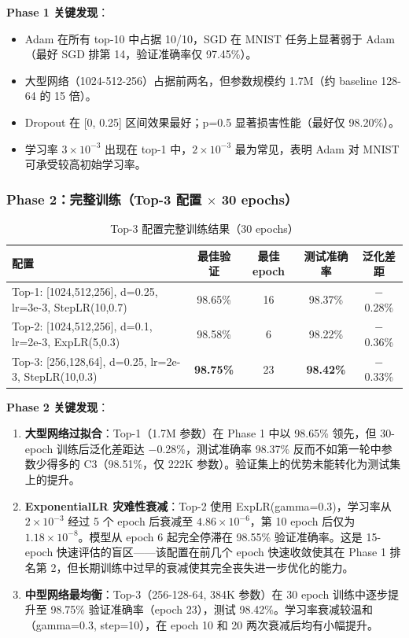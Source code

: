 \documentclass[12pt,a4paper]{ctexart}
\begin{document}
\textbf{Phase 1 关键发现}：
\begin{itemize}
    \item Adam 在所有 top-10 中占据 10/10，SGD 在 MNIST 任务上显著弱于 Adam（最好 SGD 排第 14，验证准确率仅 97.45\%）。
    \item 大型网络（1024-512-256）占据前两名，但参数规模约 1.7M（约 baseline 128-64 的 15 倍）。
    \item Dropout 在 [0, 0.25] 区间效果最好；p=0.5 显著损害性能（最好仅 98.20\%）。
    \item 学习率 $3 \times 10^{-3}$ 出现在 top-1 中，$2 \times 10^{-3}$ 最为常见，表明 Adam 对 MNIST 可承受较高初始学习率。
\end{itemize}

\subsubsection{Phase 2：完整训练（Top-3 配置 $\times$ 30 epochs）}

\begin{table}[H]
\centering
\caption{Top-3 配置完整训练结果（30 epochs）}
\begin{tabular}{@{}lcccc@{}}
\toprule
\textbf{配置} & \textbf{最佳验证} & \textbf{最佳 epoch} & \textbf{测试准确率} & \textbf{泛化差距} \\
\midrule
Top-1: [1024,512,256], d=0.25, lr=3e-3, StepLR(10,0.7)
    & 98.65\% & 16 & 98.37\% & $-$0.28\% \\
Top-2: [1024,512,256], d=0.1, lr=2e-3, ExpLR(5,0.3)
    & 98.58\% & 6  & 98.22\% & $-$0.36\% \\
Top-3: [256,128,64], d=0.25, lr=2e-3, StepLR(10,0.3)
    & \textbf{98.75\%} & 23 & \textbf{98.42\%} & $-$0.33\% \\
\bottomrule
\end{tabular}
\end{table}

\textbf{Phase 2 关键发现}：

\begin{enumerate}
    \item \textbf{大型网络过拟合}：Top-1（1.7M 参数）在 Phase 1 中以 98.65\% 领先，但 30-epoch 训练后泛化差距达 $-$0.28\%，测试准确率 98.37\% 反而不如第一轮中参数少得多的 C3（98.51\%，仅 222K 参数）。验证集上的优势未能转化为测试集上的提升。

    \item \textbf{ExponentialLR 灾难性衰减}：Top-2 使用 ExpLR(gamma=0.3)，学习率从 $2 \times 10^{-3}$ 经过 5 个 epoch 后衰减至 $4.86 \times 10^{-6}$，第 10 epoch 后仅为 $1.18 \times 10^{-8}$。模型从 epoch 6 起完全停滞在 98.55\% 验证准确率。这是 15-epoch 快速评估的盲区——该配置在前几个 epoch 快速收敛使其在 Phase 1 排名第 2，但长期训练中过早的衰减使其完全丧失进一步优化的能力。

    \item \textbf{中型网络最均衡}：Top-3（256-128-64, 384K 参数）在 30 epoch 训练中逐步提升至 98.75\% 验证准确率（epoch 23），测试 98.42\%。学习率衰减较温和（gamma=0.3, step=10），在 epoch 10 和 20 两次衰减后均有小幅提升。
\end{enumerate}
\end{document}
